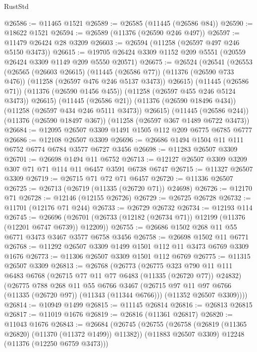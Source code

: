 \begin{lexlean}{RustStd}
\begin{coremodule}
{{{{{{{{{{{{{{{{{{{@26586 := @11465 @1521
@26589 := @26585 (@11445 (@26586 @84))
@26590 := @18622 @1521
@26594 := @26589 (@11376 (@26590 @246 @497))
@26597 := @11479 @26424 @28 @3209
@26603 := @26594 (@11258 (@26597 @497 @246 @5150 @3473))
@26615 := @19705 @26424 @3309 @1152 @209 @5551 (@20559 @26424 @3309 @1149 @209 @5550 @20571)
@26675 := @26524
    (@26541
      (@26553
        (@26565
          (@26603 @26615)
          (@11445 (@26586 @77))
          (@11376 (@26590 @733 @476))
          (@11258 (@26597 @476 @246 @5137 @3473))
          @26615)
        (@11445 (@26586 @71))
        (@11376 (@26590 @1456 @455))
        (@11258 (@26597 @455 @246 @5124 @3473))
        @26615)
      (@11445 (@26586 @21))
      (@11376 (@26590 @18496 @434))
      (@11258 (@26597 @434 @246 @5111 @3473))
      @26615)
    (@11445 (@26586 @244))
    (@11376 (@26590 @18497 @367))
    (@11258 (@26597 @367 @1489 @6722 @3473))
@26684 := @12095 @26507 @3309 @1491 @1505 @112 @209 @6775 @6785 @6777
@26686 := @12108 @26507 @3309
@26696 := @26686 @1494 @1504 @11 @111 @6752 @6774 @6784 @3577 @6727 @3456
@26698 := @11283 @26507 @3309
@26701 := @26698 @1494 @11 @6752
@26713 := @12127 @26507 @3309 @3209 @307 @71 @71 @114 @11 @6457 @3591 @6738 @6747
@26715 := @11327 @26507 @3309
@26719 := @26715 @71 @72 @71 @6457
@26720 := @11336 @26507
@26725 := @26713 (@26719 (@11335 (@26720 @71)) @24698)
@26726 := @12170 @71
@26728 := @12146 (@12155 @26726)
@26729 := @26725 @26728
@26732 := @11701 (@12176 @71 @244)
@26733 := @26729 @26732
@26734 := @12193 @114
@26745 := @26696 (@26701 (@26733 (@12182 (@26734 @71)) @12199 (@11376 (@12201 @6747 @6739)) @12209))
@26755 := @26686 @1502 @268 @11 @55 @6771 @3473 @3467 @3577 @6758 @3456
@26758 := @26698 @1502 @11 @6771
@26768 := @11292 @26507 @3309 @1499 @1501 @112 @11 @3473 @6769 @3309 @1676
@26773 := @11306 @26507 @3309 @1501 @112 @6769
@26775 := @11315 @26507 @3309
@26813 := @26768
    (@26773
      (@26775
        @323
        @790
        @11
        @111
        @6483
        @6768
        (@26715 @77 @11 @77 @6483 (@11335 (@26720 @77)) @24832)
        (@26775
          @788
          @268
          @11
          @55
          @6766
          @3467
          (@26715 @97 @11 @97 @6766 (@11335 (@26720 @97)) (@11343 (@11344 @6766)))
          (@11352 @26507 @3309))))
@26814 := @10949 @1499
@26815 := @11145 @26814
@26816 := @26813 @26815
@26817 := @11019 @1676
@26819 := @26816 (@11361 @26817)
@26820 := @11043 @1676
@26843 := @26684
    (@26745
      (@26755
        (@26758 (@26819 (@11365 @26820) (@11370 (@11372 @1499)) @11382))
        (@11883 @26507 @3309)
        @12248
        (@11376 (@12250 @6759 @3473)))
}}}}}}}}}}}}}}}}}}}
\end{coremodule}
\end{lexlean}
